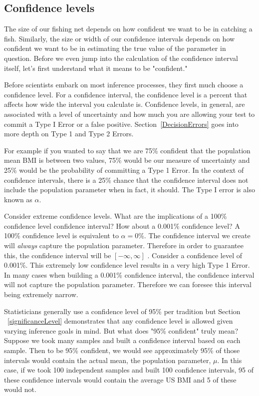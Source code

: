 \subsection{Confidence levels}

The size of our fishing net depends on how confident we want to be in catching a fish. Similarly, the size or width of our confidence intervals depends on how confident we want to be in estimating the true value of the parameter in question. Before we even jump into the calculation of the confidence interval itself, let's first understand what it means to be "confident." 

Before scientists embark on most inference processes, they first much choose a confidence level. For a confidence interval, the confidence level is a percent that affects how wide the interval you calculate is. Confidence levels, in general, are associated with a level of uncertainty and how much you are allowing your test to commit a Type I Error or a false positive. Section~\ref{DecisionErrors} goes into more depth on Type 1 and Type 2 Errors. 

For example if you wanted to say that we are 75\% confident that the population mean BMI is between two values, 75\% would be our measure of uncertainty and 25\% would be the probability of committing a Type 1 Error. In the context of confidence intervals, there is a 25\% chance that the confidence interval does not include the population parameter when in fact, it should. The Type I error is also known as $\alpha$.  

\begin{example}{Consider extreme confidence levels. What are the implications of a 100\% confidence level confidence interval? How about a 0.001\% confidence level?} \label{extremeConfidenceLevels}
A 100\% confidence level is equivalent to $\alpha = 0\%$. The confidence interval we create will \emph{always} capture the population parameter. Therefore in order to guarantee this, the confidence interval will be $[-\infty, \infty]$ . Consider a confidence level of 0.001\%. This extremely low confidence level results in a very high Type 1 Error. In many cases when building a 0.001\% confidence interval, the confidence interval will not capture the population parameter. Therefore we can foresee this interval being extremely narrow. 
\end{example}

Statisticians generally use a confidence level of 95\% per tradition but Section ~\ref{significanceLevel} demonstrates that any confidence level is allowed given varying inference goals in mind. But what does "95\% confident" truly mean? Suppose we took many samples and built a confidence interval based on each sample. Then to be 95\% confident, we would see approximately 95\% of those intervals would contain the actual mean, the population parameter, $\mu$. In this case, if we took 100 independent samples and built 100 confidence intervals, 95 of these confidence intervals would contain the average US BMI and 5 of these would not.

